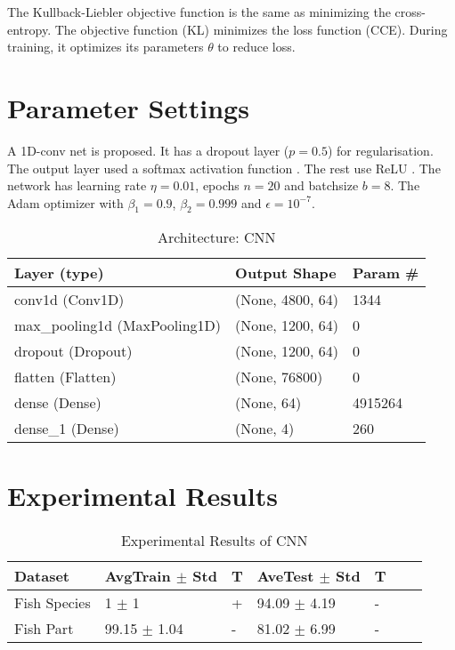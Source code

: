 The Kullback-Liebler objective function is the same as minimizing the cross-entropy. The objective function (KL) minimizes the loss function (CCE). During training, it optimizes its parameters $\theta$ to reduce loss.

\section{Parameter Settings}

A 1D-conv net is proposed. It has a dropout layer ($p = 0.5$) for regularisation. The output layer used a softmax activation function \cite{simonyan2014very}. The rest use ReLU \cite{fukushima1982neocognitron}. The network has learning rate $\eta = 0.01$, epochs $n = 20$ and batchsize $b = 8$. The Adam \cite{kingma2014adam} optimizer  with $\beta_1 = 0.9$, $\beta_2 = 0.999$ and $\epsilon = 10^{-7}$.

\begin{table}[H]
    \caption{Architecture: CNN}
    \vspace{0.5cm}
    \centering
    \label{tab:aug_architecture}
    \begin{tabular}{lll}
        \hline
        Layer (type)                  & Output Shape     & Param \# \\ \hline
        conv1d (Conv1D)               & (None, 4800, 64) & 1344     \\
        max\_pooling1d (MaxPooling1D) & (None, 1200, 64) & 0        \\
        dropout (Dropout)             & (None, 1200, 64) & 0        \\
        flatten (Flatten)             & (None, 76800)    & 0        \\
        dense (Dense)                 & (None, 64)       & 4915264  \\
        dense\_1 (Dense)              & (None, 4)        & 260      \\ \hline
    \end{tabular}
\end{table}

\section{Experimental Results}
\label{sec:nn-results}

\begin{table}[H]\label{t:cnn-results}
    \centering
    \begin{tabular}{|l|l|l|l|l|l|l|}
        \hline
        Dataset      & AvgTrain $\pm$ Std & T & AveTest $\pm$ Std & T \\
        \hline
        Fish Species & 1 $\pm$ 1          & + & 94.09 $\pm$ 4.19  & - \\
        Fish Part    & 99.15 $\pm$ 1.04   & - & 81.02 $\pm$ 6.99  & - \\
        \hline
    \end{tabular}
    \caption{Experimental Results of CNN}
\end{table}

